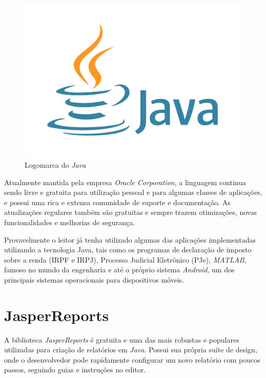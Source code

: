 \documentclass[
	12pt,			%
	openright,		%
	oneside,	
	a4paper,		%
	english,		%
	brazil			%
]{abntex2/abntex2}  %
\begin{document}
	\begin{figure}[H]
		
		\caption{\label{java-logo}Logomarca do \textit{Java}}
		\begin{center}
			\includegraphics[scale=0.04]{img/java-logo}
		\end{center}
		
	\end{figure}
	
	Atualmente mantida pela empresa \textit{Oracle Corporation}, a linguagem continua sendo livre e gratuita para utilização pessoal e para algumas classes de aplicações, e possui uma rica e extensa comunidade de suporte e documentação. As atualizações regulares também são gratuitas e sempre trazem otimizações, novas funcionalidades e melhorias de segurança.

	Provavelmente o leitor já tenha utilizado algumas das aplicações implementadas utilizando a tecnologia Java, tais como os programas de declaração de imposto sobre a renda (IRPF e IRPJ), Processo Judicial Eletrônico (PJe), \textit{MATLAB}, famoso no mundo da engenharia e até o próprio sistema \textit{Android}, um dos principais sistemas operacionais para dispositivos móveis.
	
	\section{JasperReports\textregistered}
	
	A biblioteca \textit{JasperReports\textregistered} \cite{jasper} é gratuita e uma das mais robustas e populares utilizadas para criação de relatórios em \textit{Java}. Possui sua própria suíte de design, onde o desenvolvedor pode rapidamente configurar um novo relatório com poucos passos, seguindo guias e instruções no editor.
	
\end{document}

